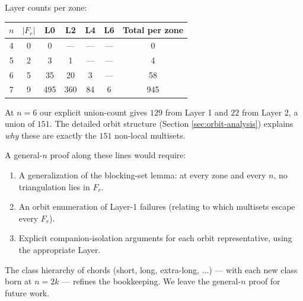 \documentclass[11pt]{article}
\theoremstyle{definition}
\begin{document}
Layer counts per zone:
\begin{center}
\begin{tabular}{c|c|c|c|c|c|c}
\toprule
$n$ & $|F_r|$ & L0 & L2 & L4 & L6 & Total per zone\\
\midrule
4 & 0 & 0 & --- & --- & --- & 0\\
5 & 2 & 3 & 1 & --- & --- & 4\\
6 & 5 & 35 & 20 & 3 & --- & 58\\
7 & 9 & 495 & 360 & 84 & 6 & 945\\
\bottomrule
\end{tabular}
\end{center}

At $n=6$ our explicit union-count gives $129$ from Layer 1 and $22$ from
Layer 2, a union of $151$. The detailed orbit structure (Section
\ref{sec:orbit-analysis}) explains \emph{why} these are exactly the $151$
non-local multisets.

A general-$n$ proof along these lines would require:
\begin{enumerate}[nosep,leftmargin=2em]
\item A generalization of the blocking-set lemma: at every zone and every
$n$, no triangulation lies in $F_r$.
\item An orbit enumeration of Layer-1 failures (relating to which multisets
escape every $F_r$).
\item Explicit companion-isolation arguments for each orbit representative,
using the appropriate Layer.
\end{enumerate}
The class hierarchy of chords (short, long, extra-long, $\ldots$) — with
each new class born at $n = 2k$ — refines the bookkeeping. We leave the
general-$n$ proof for future work.
\end{document}
